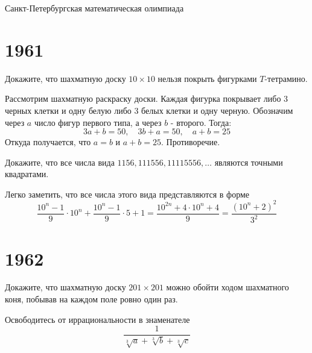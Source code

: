 \documentclass[11pt, a4paper]{problems_template}
\begin{document}
\begin{titlepage}
  \begin{center}
	\Huge{Санкт-Петербургская математическая олимпиада}
  \end{center}
\end{titlepage} 

\chapter{1961}

\begin{exercise}[21]
Докажите, что шахматную доску $10 \times 10$ нельзя покрыть фигурками $T$-тетрамино.
\end{exercise}

\begin{Solution}
Рассмотрим шахматную раскраску доски. Каждая фигурка покрывает либо 3 черных клетки и одну белую либо 3 белых клетки и одну черную.  Обозначим через $a$ число фигур первого типа, а через $b$ - второго. Тогда:
$$
3a + b = 50, \quad 3b + a = 50, \quad a + b = 25
$$
Откуда получается, что $a = b$ и $a + b = 25$. Противоречие.
\end{Solution}

\begin{exercise}[23]
Докажите, что все числа вида $1156, 111556, 11115556, \dots$ являются точными квадратами.
\end{exercise}

\begin{Solution}
Легко заметить, что все числа этого вида представляются в форме
$$
\frac{10^{n}-1}{9} \cdot 10^{n} + \frac{10^{n} - 1}{9} \cdot 5 + 1 = \frac{10^{2n} + 4 \cdot 10^{n} + 4}{9} = \frac{(10^{n} + 2)^{2}}{3^{2}}
$$
\end{Solution}

\chapter{1962}

\begin{exercise}[5]
Докажите, что шахматную доску $201 \times 201$ можно обойти ходом шахматного коня, побывав на каждом поле ровно один раз.
\end{exercise}

\begin{exercise}[32]
Освободитесь от иррациональности в знаменателе
$$
\frac{1}{\sqrt[3]{a} + \sqrt[3]{b} + \sqrt[3]{c}}
$$
\end{exercise}
\end{document}
